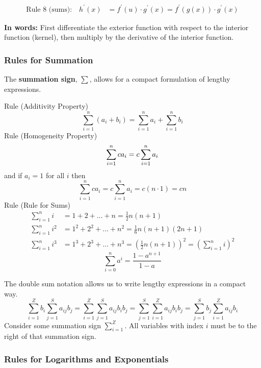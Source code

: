 \begin{align*}
	\text{Rule 8 (sums):}\quad	h^{\prime}(x)&=f^{\prime}(u) \cdot g^{\prime}(x)=f^{\prime}(g(x)) \cdot g^{\prime}(x)
\end{align*}

\textbf{In words:} First differentiate the exterior function with respect to the interior function (kernel), then multiply by the derivative of the interior function.






\pbn
\subsubsection*{Rules for Summation}
The \textbf{summation sign}, $\sum$, allows for a compact formulation of
lengthy expressions.


Rule  (Additivity Property)
$$
\sum_{i=1}^{n}\left(a_{i}+b_{i}\right)=\sum_{i=1}^{n} a_{i}+\sum_{i=1}^{n} b_{i}
$$
Rule  (Homogeneity Property)
$$
\sum_{i=1}^{n} c a_{i}=c \sum_{i=1}^{n} a_{i} \\
$$
and if $a_{i}=1$ for all $i$ then
$$
\sum_{i=1}^{n} c a_{i}=c \sum_{i=1}^{n} a_{i}=c(n \cdot 1)=c n
$$
Rule (Rule for Sums)
\begin{align*}
	\sum_{i=1}^{n} i&=1+2+\ldots+n=\frac{1}{2} n(n+1) \\
	\sum_{i=1}^{n} i^{2}&=1^{2}+2^{2}+\ldots+n^{2}=\frac{1}{6} n(n+1)(2 n+1) \\
	\sum_{i=1}^{n} i^{3}&=1^{3}+2^{3}+\ldots+n^{3}=\left(\frac{1}{2} n(n+1)\right)^{2}=\left(\sum_{i=1}^{n} i\right)^{2}
\end{align*}
$$
\sum_{i=0}^{n} a^{i}=\frac{1-a^{n+1}}{1-a}
$$

The double sum notation allows us to write lengthy expressions in a compact way.
$$
\sum_{i=1}^{Z} b_{i} \sum_{j=1}^{S} a_{i j} b_{j}=\sum_{i=1}^{Z} \sum_{j=1}^{S} a_{i j} b_{i} b_{j}=\sum_{j=1}^{S} \sum_{i=1}^{Z} a_{i j} b_{i} b_{j}=\sum_{j=1}^{S} b_{j} \sum_{i=1}^{Z} a_{i j} b_{i}
$$
Consider some summation sign $\sum_{i=1}^{Z} .$ All variables with index $i$ must be to the right of that summation sign.


\subsubsection*{Rules for Logarithms and Exponentials}

